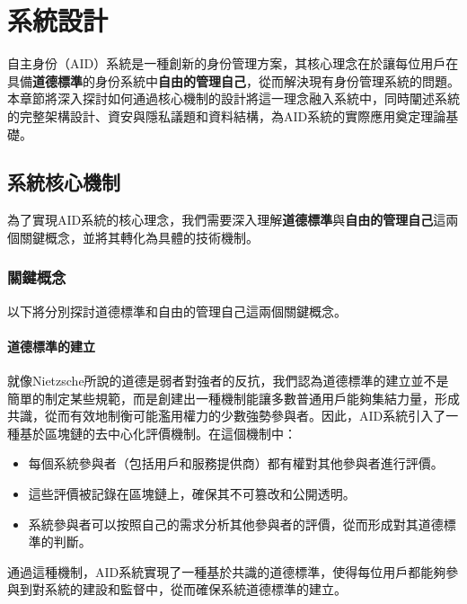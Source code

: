 
\chapter{系統設計}
自主身份（AID）系統是一種創新的身份管理方案，其核心理念在於讓每位用戶在具備\textbf{道德標準}的身份系統中\textbf{自由的管理自己}，從而解決現有身份管理系統的問題。本章節將深入探討如何通過核心機制的設計將這一理念融入系統中，同時闡述系統的完整架構設計、資安與隱私議題和資料結構，為AID系統的實際應用奠定理論基礎。
\section{系統核心機制}
為了實現AID系統的核心理念，我們需要深入理解\textbf{道德標準}與\textbf{自由的管理自己}這兩個關鍵概念，並將其轉化為具體的技術機制。
\subsection{關鍵概念}
以下將分別探討道德標準和自由的管理自己這兩個關鍵概念。
\subsubsection{道德標準的建立}
就像Nietzsche所說的道德是弱者對強者的反抗，我們認為道德標準的建立並不是簡單的制定某些規範，而是創建出一種機制能讓多數普通用戶能夠集結力量，形成共識，從而有效地制衡可能濫用權力的少數強勢參與者。因此，AID系統引入了一種基於區塊鏈的去中心化評價機制。在這個機制中：
\begin{itemize}
  \item 每個系統參與者（包括用戶和服務提供商）都有權對其他參與者進行評價。
  \item 這些評價被記錄在區塊鏈上，確保其不可篡改和公開透明。
  \item 系統參與者可以按照自己的需求分析其他參與者的評價，從而形成對其道德標準的判斷。
\end{itemize}
通過這種機制，AID系統實現了一種基於共識的道德標準，使得每位用戶都能夠參與到對系統的建設和監督中，從而確保系統道德標準的建立。
